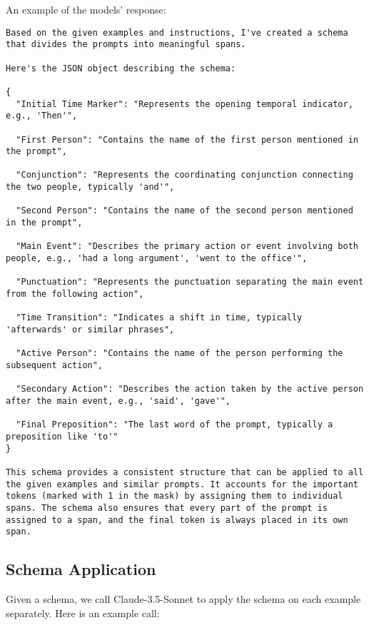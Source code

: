An example of the models' response:

\begin{lstlisting}
Based on the given examples and instructions, I've created a schema that divides the prompts into meaningful spans. 

Here's the JSON object describing the schema:

{
  "Initial Time Marker": "Represents the opening temporal indicator, e.g., 'Then'",

  "First Person": "Contains the name of the first person mentioned in the prompt",

  "Conjunction": "Represents the coordinating conjunction connecting the two people, typically 'and'",

  "Second Person": "Contains the name of the second person mentioned in the prompt",

  "Main Event": "Describes the primary action or event involving both people, e.g., 'had a long argument', 'went to the office'",

  "Punctuation": "Represents the punctuation separating the main event from the following action",

  "Time Transition": "Indicates a shift in time, typically 'afterwards' or similar phrases",

  "Active Person": "Contains the name of the person performing the subsequent action",

  "Secondary Action": "Describes the action taken by the active person after the main event, e.g., 'said', 'gave'",

  "Final Preposition": "The last word of the prompt, typically a preposition like 'to'"
}

This schema provides a consistent structure that can be applied to all the given examples and similar prompts. It accounts for the important tokens (marked with 1 in the mask) by assigning them to individual spans. The schema also ensures that every part of the prompt is assigned to a span, and the final token is always placed in its own span.
\end{lstlisting}



\subsection{Schema Application} \label{ap:schema application}

Given a schema, we call Claude-3.5-Sonnet to apply the schema on each example separately. Here is an example call:

